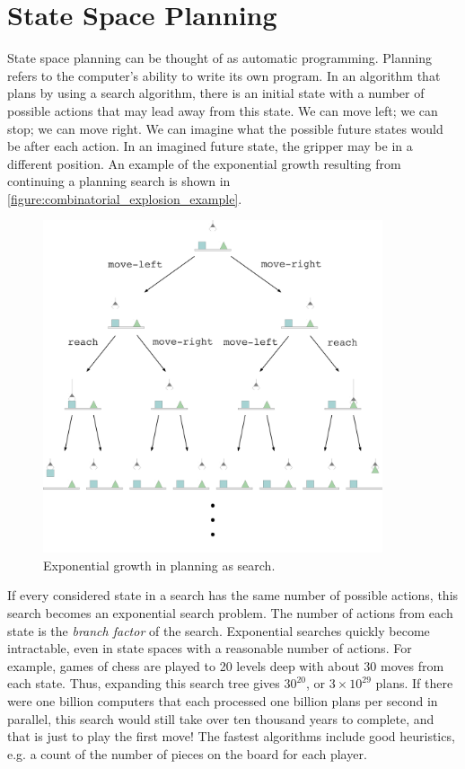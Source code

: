 \section{State Space Planning}

State space planning can be thought of as automatic programming.
Planning refers to the computer's ability to write its own program.
In an algorithm that plans by using a search algorithm, there is an
initial state with a number of possible actions that may lead away
from this state.  We can move left; we can stop; we can move right.
We can imagine what the possible future states would be after each
action.  In an imagined future state, the gripper may be in a
different position.  An example of the exponential growth resulting
from continuing a planning search is shown in
{\mbox{\autoref{figure:combinatorial_explosion_example}}}.
\begin{figure}
\center
\includegraphics[width=10cm]{gfx/combinatorial_explosion_example}
\caption{Exponential growth in planning as search.}
\label{figure:combinatorial_explosion_example}
\end{figure}
If every considered state in a search has the same number of possible
actions, this search becomes an exponential search problem.  The
number of actions from each state is the \emph{branch factor} of the
search.  Exponential searches quickly become intractable, even in
state spaces with a reasonable number of actions.  For example, games
of chess are played to 20 levels deep with about 30 moves from each
state.  Thus, expanding this search tree gives $30^{20}$, or $3 \times
10^{29}$ plans.  If there were one billion computers that each
processed one billion plans per second in parallel, this search would
still take over ten thousand years to complete, and that is just to
play the first move!  The fastest algorithms include good heuristics,
e.g. a count of the number of pieces on the board for each player.

